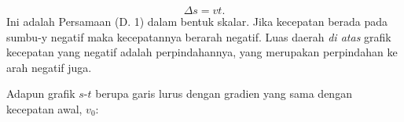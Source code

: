 \documentclass[12pt, a4paper]{article}\usepackage[utf8]{inputenc}
\theoremstyle{plain}
\theoremstyle{plain}
\numberwithin{equation}{section}
\theoremstyle{definition}
\begin{document}
	\begin{equation*}
		\Delta s = vt.
	\end{equation*}
	Ini adalah Persamaan (D. 1) dalam bentuk skalar. Jika kecepatan berada pada sumbu-y negatif maka kecepatannya berarah negatif. Luas daerah \emph{di atas} grafik kecepatan yang negatif adalah perpindahannya, yang merupakan perpindahan ke arah negatif juga.

	 Adapun grafik $s$-$t$ berupa garis lurus dengan gradien yang sama dengan kecepatan awal, $v_0$:
	 
	 \begin{figure}[htb]
	 	\centering
	 	
	 	
\end{figure}
\end{document}
